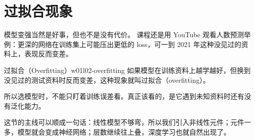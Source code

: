 \documentclass[main.tex]{subfiles}
\begin{document}
\section{过拟合现象}
\label{sec:w01l02-overfitting}

模型变强当然是好事，但也不是没有代价。
课程还是用 YouTube 观看人数预测举例：更深的网络在训练集上可能压出更低的 loss，可一到 2021 年这种没见过的资料上，表现反而变差。

\begin{definition}{过拟合（Overfitting）}{w01l02-overfitting}
如果模型在训练资料上越学越好，但换到没见过的测试资料时反而变差，这种现象就叫过拟合（overfitting）。
\end{definition}

所以选模型时，不能只盯着训练误差看。真正该看的，是它遇到未知资料时还有没有泛化能力。

\begin{summarybox}
这节的主线可以顺成一句话：线性模型不够弯，所以我们引入非线性元件；元件一多，模型就会变成神经网络；层数继续往上叠，深度学习也就自然出现了。
\end{summarybox}
\end{document}
